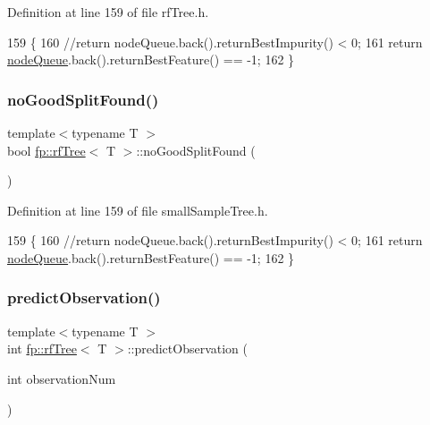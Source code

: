 Definition at line 159 of file rf\+Tree.\+h.


\begin{DoxyCode}
159                                               \{
160                     \textcolor{comment}{//return nodeQueue.back().returnBestImpurity() < 0;}
161                     \textcolor{keywordflow}{return} \hyperlink{classfp_1_1rfTree_af72d0a2f930fd480dfb4858885c2df23}{nodeQueue}.back().returnBestFeature() == -1;
162                 \}
\end{DoxyCode}
\mbox{\label{classfp_1_1rfTree_a618bdc2d22267b4bb4f5e1881b1788f6}} 
\subsubsection{\texorpdfstring{no\+Good\+Split\+Found()}{noGoodSplitFound()}\hspace{0.1cm}{\footnotesize\ttfamily [2/2]}}
{\footnotesize\ttfamily template$<$typename T $>$ \\
bool \hyperlink{classfp_1_1rfTree}{fp\+::rf\+Tree}$<$ T $>$\+::no\+Good\+Split\+Found (\begin{DoxyParamCaption}{ }\end{DoxyParamCaption})\hspace{0.3cm}{\ttfamily [inline]}}



Definition at line 159 of file small\+Sample\+Tree.\+h.


\begin{DoxyCode}
159                                               \{
160                     \textcolor{comment}{//return nodeQueue.back().returnBestImpurity() < 0;}
161                     \textcolor{keywordflow}{return} \hyperlink{classfp_1_1rfTree_af72d0a2f930fd480dfb4858885c2df23}{nodeQueue}.back().returnBestFeature() == -1;
162                 \}
\end{DoxyCode}
\mbox{\label{classfp_1_1rfTree_aad66c44e2062c163b1560f9bf1bd759f}} 
\subsubsection{\texorpdfstring{predict\+Observation()}{predictObservation()}\hspace{0.1cm}{\footnotesize\ttfamily [1/2]}}
{\footnotesize\ttfamily template$<$typename T $>$ \\
int \hyperlink{classfp_1_1rfTree}{fp\+::rf\+Tree}$<$ T $>$\+::predict\+Observation (\begin{DoxyParamCaption}\item[{int}]{observation\+Num }\end{DoxyParamCaption})\hspace{0.3cm}{\ttfamily [inline]}}



